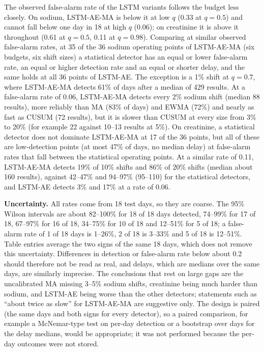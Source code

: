 \documentclass[conference]{IEEEtran}
\begin{document}
The observed false-alarm rate of the LSTM variants follows the budget less closely. On sodium, LSTM-AE-MA is below it at low $q$ (0.33 at $q=0.5$) and cannot fall below one day in 18 at high $q$ (0.06); on creatinine it is above it throughout (0.61 at $q=0.5$, 0.11 at $q=0.98$). Comparing at similar observed false-alarm rates, at 35 of the 36 sodium operating points of LSTM-AE-MA (six budgets, six shift sizes) a statistical detector has an equal or lower false-alarm rate, an equal or higher detection rate and an equal or shorter delay, and the same holds at all 36 points of LSTM-AE. The exception is a 1\% shift at $q=0.7$, where LSTM-AE-MA detects 61\% of days after a median of 429 results. At a false-alarm rate of 0.06, LSTM-AE-MA detects every 2\% sodium shift (median 88 results), more reliably than MA (83\% of days) and EWMA (72\%) and nearly as fast as CUSUM (72 results), but it is slower than CUSUM at every size from 3\% to 20\% (for example 22 against 10--13 results at 5\%). On creatinine, a statistical detector does not dominate LSTM-AE-MA at 17 of the 36 points, but all of these are low-detection points (at most 47\% of days, no median delay) at false-alarm rates that fall between the statistical operating points. At a similar rate of 0.11, LSTM-AE-MA detects 19\% of 10\% shifts and 86\% of 20\% shifts (median about 160 results), against 42--47\% and 94--97\% (95--110) for the statistical detectors, and LSTM-AE detects 3\% and 17\% at a rate of 0.06.

\textbf{Uncertainty.} All rates come from 18 test days, so they are coarse. The 95\% Wilson intervals are about 82--100\% for 18 of 18 days detected, 74--99\% for 17 of 18, 67--97\% for 16 of 18, 34--75\% for 10 of 18 and 12--51\% for 5 of 18; a false-alarm rate of 1 of 18 days is 1--26\%, 2 of 18 is 3--33\% and 5 of 18 is 12--51\%. Table entries average the two signs of the same 18 days, which does not remove this uncertainty. Differences in detection or false-alarm rate below about 0.2 should therefore not be read as real, and delays, which are medians over the same days, are similarly imprecise. The conclusions that rest on large gaps are the uncalibrated MA missing 3--5\% sodium shifts, creatinine being much harder than sodium, and LSTM-AE being worse than the other detectors; statements such as ``about twice as slow'' for LSTM-AE-MA are suggestive only. The design is paired (the same days and both signs for every detector), so a paired comparison, for example a McNemar-type test on per-day detection or a bootstrap over days for the delay medians, would be appropriate; it was not performed because the per-day outcomes were not stored.
\end{document}
